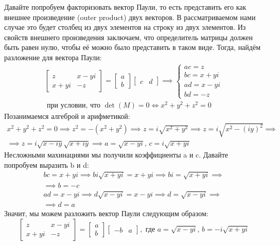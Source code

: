Давайте попробуем факторизовать вектор Паули, то есть представить его как внешнее произведение (outer product) двух векторов. В рассматриваемом нами случае это будет столбец из двух элементов на строку из двух элементов. Из свойств внешнего произведения заключаем, что определитель матрицы должен быть равен нулю, чтобы её можно было представить в таком виде. Тогда, найдём разложение для вектора Паули:
\begin{gather*}
\begin{bmatrix} z & x-yi\\ x + yi & -z \end{bmatrix} = \begin{bmatrix} a \\ b \end{bmatrix}\begin{bmatrix} c & d \end{bmatrix} \implies \begin{cases} ac = z \\ bc = x + yi \\ ad = x - yi \\ bd = -z \end{cases} \\ 
\text{ при условии, что } \det(M) = 0 \Longleftrightarrow x^2 + y^2 + z^2 = 0
\end{gather*}
Позанимаемся алгеброй и арифметикой:
\begin{gather*}
    x^2 + y^2 + z^2 = 0 \implies z^2 = -(x^2 + y^2) \implies z = i\sqrt{x^2 + y^2} \implies z = i\sqrt{x^2 - (iy)^2} \implies \\ \implies z = i\sqrt{x-iy}\sqrt{x+iy} \implies a = \sqrt{x-yi},\, c = i\sqrt{x+yi}
\end{gather*}
Несложными махинациями мы получили коэффициенты a и c. Давайте попробуем выразить b и d:
\begin{gather*}
    bc = x + yi \implies b i\sqrt{x+yi} = x + yi \implies bi = \sqrt{x+yi} \implies \\ \implies b = -c \\
    ad = x - yi \implies d\sqrt{x-yi} = x - yi \implies d = \sqrt{x - yi} \implies \\ \implies d = a
\end{gather*}
Значит, мы можем разложить вектор Паули следующим образом:
\[
\begin{bmatrix} z & x-yi\\ x + yi & -z \end{bmatrix} = \begin{bmatrix} a \\ b \end{bmatrix}\begin{bmatrix} -b & a \end{bmatrix}, \text{ где } a = \sqrt{x-yi},\, b = -i\sqrt{x+yi}
\]
